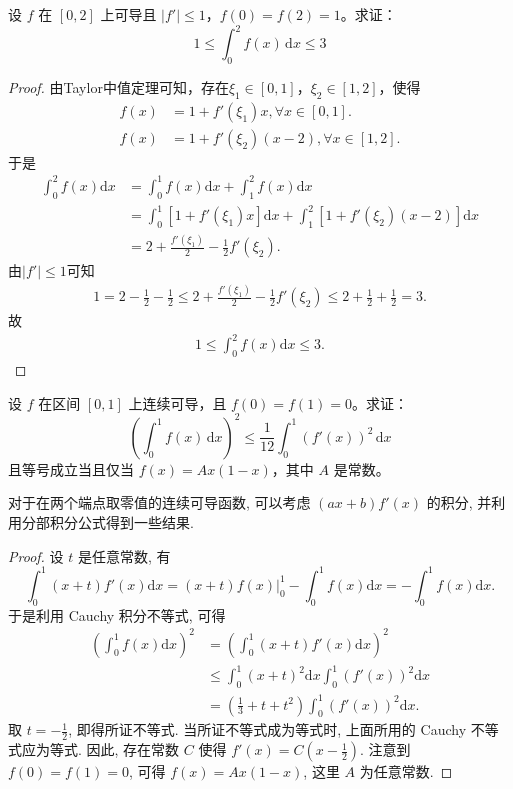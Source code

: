 \documentclass[../../main.tex]{subfiles}
\begin{document}
\begin{example}
设 \( f \) 在 \([0,2]\) 上可导且 \(|f'| \leqslant 1\)，\( f(0) = f(2) = 1 \)。求证：
\[
1 \leqslant \int_{0}^{2} f(x) \, \mathrm{d}x \leqslant 3
\]
\end{example}
\begin{proof}
由Taylor中值定理可知，存在$\xi_1\in[0,1]$，$\xi_2\in[1,2]$，使得
\begin{align*}
f(x)&=1+f'(\xi_1)x,\forall x\in[0,1].\\
f(x)&=1+f'(\xi_2)(x-2),\forall x\in[1,2].
\end{align*}
于是
\begin{align*}
\int_0^2 f(x)\mathrm{d}x&=\int_0^1 f(x)\mathrm{d}x+\int_1^2 f(x)\mathrm{d}x\\
&=\int_0^1 [1+f'(\xi_1)x]\mathrm{d}x+\int_1^2 [1+f'(\xi_2)(x-2)]\mathrm{d}x\\
&=2+\frac{f'(\xi_1)}{2}-\frac{1}{2}f'(\xi_2).
\end{align*}
由$|f'|\leqslant1$可知
\begin{align*}
1=2-\frac{1}{2}-\frac{1}{2}\leqslant 2+\frac{f'(\xi_1)}{2}-\frac{1}{2}f'(\xi_2)\leqslant 2+\frac{1}{2}+\frac{1}{2}=3.
\end{align*}
故
\begin{align*}
1\leqslant \int_0^2 f(x)\mathrm{d}x\leqslant 3.
\end{align*}
\end{proof}

\begin{example}
设 \( f \) 在区间 \([0,1]\) 上连续可导，且 \( f(0) = f(1) = 0 \)。求证：
\[
\left( \int_{0}^{1} f(x) \, \mathrm{d}x \right)^{2} \leqslant \frac{1}{12} \int_{0}^{1} \left( f'(x) \right)^{2} \, \mathrm{d}x
\]
且等号成立当且仅当 \( f(x) = Ax(1 - x) \)，其中 \( A \) 是常数。
\end{example}
\begin{note}
对于在两个端点取零值的连续可导函数, 可以考虑 \((ax + b)f'(x)\) 的积分, 并利用分部积分公式得到一些结果.
\end{note}
\begin{proof}
设 \(t\) 是任意常数, 有
\[
\int_0^1 (x + t)f'(x)\mathrm{d}x = (x + t)f(x) \Big|_0^1 - \int_0^1 f(x)\mathrm{d}x = -\int_0^1 f(x)\mathrm{d}x.
\]
于是利用 Cauchy 积分不等式, 可得
\begin{align*}
\left(\int_0^1 f(x)\mathrm{d}x\right)^2 &= \left(\int_0^1 (x + t)f'(x)\mathrm{d}x\right)^2\\
&\leqslant \int_0^1 (x + t)^2\mathrm{d}x \int_0^1 (f'(x))^2\mathrm{d}x\\
&= \left(\frac{1}{3} + t + t^2\right)\int_0^1 (f'(x))^2\mathrm{d}x.
\end{align*}
取 \(t = -\frac{1}{2}\), 即得所证不等式. 当所证不等式成为等式时, 上面所用的 Cauchy 不等式应为等式. 因此, 存在常数 \(C\) 使得 \(f'(x) = C\left(x - \frac{1}{2}\right)\). 注意到 \(f(0) = f(1) = 0\), 可得 \(f(x) = Ax(1 - x)\), 这里 \(A\) 为任意常数.
\end{proof}
\end{document}
